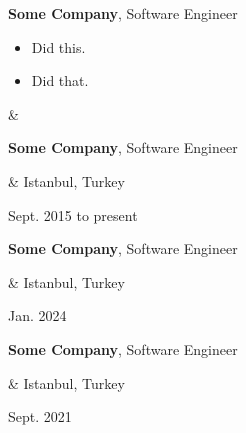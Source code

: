\documentclass[10pt, letterpaper]{article}
\newenvironment{highlights}{
        \begin{itemize}[
                topsep=0pt,
                parsep=0.10 cm,
                partopsep=0pt,
                itemsep=0pt,
                after=\vspace{-1\baselineskip},
                leftmargin=0.4 cm + 3pt
            ]
    }{
        \end{itemize}
    } %
\let\originalTabularx\tabularx
\let\originalEndTabularx\endtabularx
\renewenvironment{tabularx}{\bgroup\centering\originalTabularx}{\originalEndTabularx\par\egroup}
\begin{document}
        \vspace{0.2 cm}
        \begin{tabularx}{
            \textwidth-0.4 cm-0.13cm
        }{
            K{0.2 cm}
            R{4.1 cm}
        }
            \textbf{Some Company}, Software Engineer

            \vspace{0.10 cm}

            \begin{highlights}
                \item Did this.
                \item Did that.
            \end{highlights}
            &
            

            
        \end{tabularx}

        \vspace{0.2 cm}
        \begin{tabularx}{
            \textwidth-0.4 cm-0.13cm
        }{
            K{0.2 cm}
            R{4.1 cm}
        }
            \textbf{Some Company}, Software Engineer

            \vspace{0.10 cm}

            &
            Istanbul, Turkey

            Sept. 2015 to present
        \end{tabularx}

        \vspace{0.2 cm}
        \begin{tabularx}{
            \textwidth-0.4 cm-0.13cm
        }{
            K{0.2 cm}
            R{4.1 cm}
        }
            \textbf{Some Company}, Software Engineer

            \vspace{0.10 cm}

            &
            Istanbul, Turkey

            Jan. 2024
        \end{tabularx}

        \vspace{0.2 cm}
        \begin{tabularx}{
            \textwidth-0.4 cm-0.13cm
        }{
            K{0.2 cm}
            R{4.1 cm}
        }
            \textbf{Some Company}, Software Engineer

            \vspace{0.10 cm}

            &
            Istanbul, Turkey

            Sept. 2021
        \end{tabularx}
\end{document}
